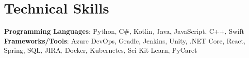 \section{Technical Skills}
 \begin{itemize}[leftmargin=0.15in, label={}]
    \small{\item{
      \textbf{Programming Languages}{: Python, C\#, Kotlin, Java, JavaScript, C++, Swift } \\
     \textbf{Frameworks/Tools}{: Azure DevOps, Gradle, Jenkins, Unity, .NET Core, React, Spring, SQL, JIRA, Docker, Kubernetes, Sci-Kit Learn, PyCaret}\\
    }}
 \end{itemize}